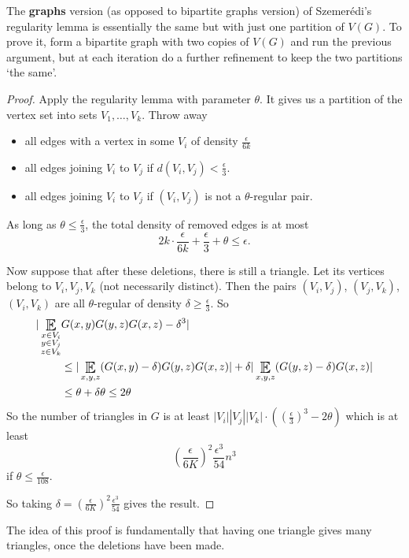 \documentclass{article}
\DeclareMathOperator*{\E}{\scalerel*{\mathbb{E}}{\textstyle\sum}}
\newcommand{\1}[1]{\mathbbm{1}_{#1}}
\begin{document}
The \textbf{graphs} version (as opposed to bipartite graphs version) of Szemer\'edi's regularity lemma is essentially the same but with just one partition of $V(G)$.
To prove it, form a bipartite graph with two copies of $V(G)$ and run the previous argument, but at each iteration do a further refinement to keep the two partitions `the same'.
\begin{proof}
  Apply the regularity lemma with parameter $\theta$.
  It gives us a partition of the vertex set into sets $V_1, \dotsc, V_k$.
  Throw away
  \begin{itemize}
    \item all edges with a vertex in some $V_i$ of density $\frac{\epsilon}{6k}$
    \item all edges joining $V_i$ to $V_j$ if $d(V_i, V_j) < \frac{\epsilon}{3}$.
    \item all edges joining $V_i$ to $V_j$ if $(V_i, V_j)$ is not a $\theta$-regular pair.
  \end{itemize}

  As long as $\theta \leq \frac{\epsilon}{3}$, the total density of removed edges is at most
  \begin{equation*}
    2k \cdot \frac{\epsilon}{6k} + \frac{\epsilon}{3} + \theta \leq \epsilon.
  \end{equation*}

  Now suppose that after these deletions, there is still a triangle.
  Let its vertices belong to $V_i,V_j,V_k$ (not necessarily distinct).
  Then the pairs $(V_i,V_j)$, $(V_j,V_k)$, $(V_i,V_k)$ are all $\theta$-regular of density $\delta \geq \frac{\epsilon}{3}$.
  So
  \begin{align*}
    |\E_{\substack{x \in V_i \\ y \in V_j \\ z \in V_k}} &G(x,y) G(y,z) G(x,z) - \delta^3| \\
                                                         &\leq |\E_{x,y,z} (G(x,y)-\delta) G(y,z) G(x,z)| + \delta|\E_{x,y,z} (G(y,z)-\delta) G(x,z)| \\ %
                                                         &\leq \theta + \delta \theta \leq 2 \theta
  \end{align*}
  So the number of triangles in $G$ is at least $|V_i||V_j||V_k| \cdot ((\frac{\epsilon}{3})^3 - 2\theta)$ which is at least
  \begin{equation*}
    \left(\frac{\epsilon}{6K}\right)^2 \frac{\epsilon^3}{54} n^3
  \end{equation*}
  if $\theta \leq \frac{\epsilon}{108}$.

  So taking $\delta = \left(\frac{\epsilon}{6K}\right)^2 \frac{\epsilon^3}{54}$ gives the result.
\end{proof}
The idea of this proof is fundamentally that having one triangle gives many triangles, once the deletions have been made.
\end{document}

